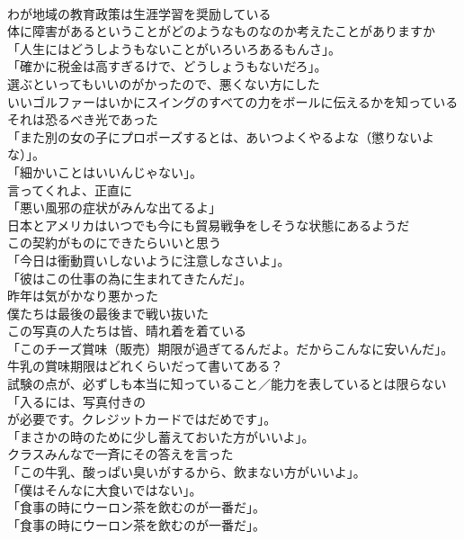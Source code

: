 \documentclass[8pt]{extreport}
\begin{document}
\begin{CJK}{UTF8}{min}
\\	わが地域の教育政策は生涯学習を奨励している	
\\	体に障害があるということがどのようなものなのか考えたことがありますか	
\\	「人生にはどうしようもないことがいろいろあるもんさ」。	
\\	「確かに税金は高すぎるけで、どうしょうもないだろ」。	
\\	選ぶといってもいいのがかったので、悪くない方にした	
\\	いいゴルファーはいかにスイングのすべての力をボールに伝えるかを知っている	
\\	それは恐るべき光であった	
\\	「また別の女の子にプロポーズするとは、あいつよくやるよな（懲りないよな）」。	
\\	「細かいことはいいんじゃない」。	
\\	言ってくれよ、正直に	
\\	「悪い風邪の症状がみんな出てるよ」	
\\	日本とアメリカはいつでも今にも貿易戦争をしそうな状態にあるようだ	
\\	この契約がものにできたらいいと思う	
\\	「今日は衝動買いしないように注意しなさいよ」。	
\\	「彼はこの仕事の為に生まれてきたんだ」。	
\\	昨年は気がかなり悪かった	
\\	僕たちは最後の最後まで戦い抜いた	
\\	この写真の人たちは皆、晴れ着を着ている	
\\	「このチーズ賞味（販売）期限が過ぎてるんだよ。だからこんなに安いんだ」。	
\\	牛乳の賞味期限はどれくらいだって書いてある？	
\\	試験の点が、必ずしも本当に知っていること／能力を表しているとは限らない	
\\	「入るには、写真付きの
\\	が必要です。クレジットカードではだめです」。	
\\	「まさかの時のために少し蓄えておいた方がいいよ」。	
\\	クラスみんなで一斉にその答えを言った	
\\	「この牛乳、酸っぱい臭いがするから、飲まない方がいいよ」。	
\\	「僕はそんなに大食いではない」。	
\\	「食事の時にウーロン茶を飲むのが一番だ」。	
\\	「食事の時にウーロン茶を飲むのが一番だ」。 

\end{CJK}
\end{document}
